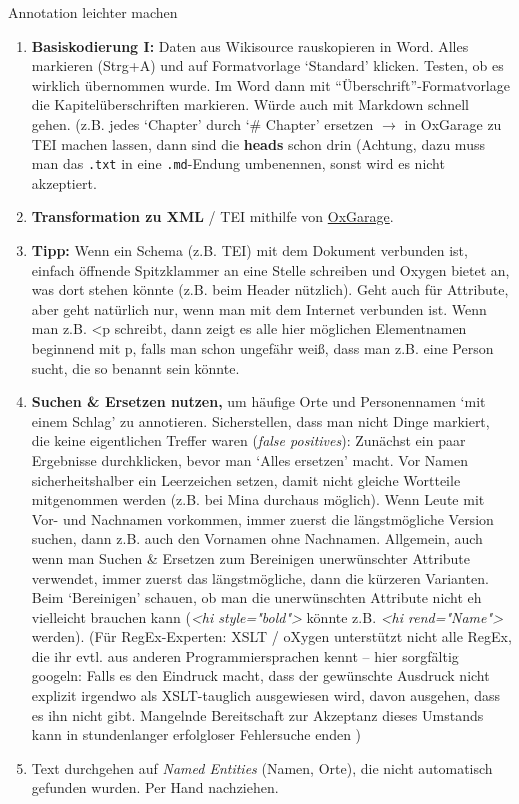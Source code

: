 \begin{frame}[allowframebreaks]{Annotation leichter machen}
\begin{enumerate}
    \item \textbf{Basiskodierung I:} Daten aus Wikisource rauskopieren in Word. Alles markieren (Strg+A) und auf Formatvorlage `Standard' klicken. Testen, ob es wirklich übernommen wurde. Im Word dann mit ``Überschrift''-Formatvorlage die Kapitelüberschriften markieren. Würde auch mit Markdown schnell gehen. 
    (z.B. jedes `Chapter' durch `\# Chapter' ersetzen $\to$ in OxGarage zu TEI machen lassen, dann sind die \textbf{heads} schon drin (Achtung, dazu muss man das \texttt{.txt} in eine \texttt{.md}-Endung umbenennen, sonst wird es nicht akzeptiert.
    \item \textbf{Transformation zu XML} / TEI mithilfe von \href{http://oxgarage.tei-c.org}{OxGarage}.
    \item \textbf{Tipp:} Wenn ein Schema (z.B. TEI) mit dem Dokument verbunden ist, einfach öffnende Spitzklammer an eine Stelle schreiben und Oxygen bietet an, was dort stehen könnte (z.B. beim Header nützlich). Geht auch für Attribute, aber geht natürlich nur, wenn man mit dem Internet verbunden ist. Wenn man z.B. <p schreibt, dann zeigt es alle hier möglichen Elementnamen beginnend mit p, falls man schon ungefähr weiß, dass man z.B. eine Person sucht, die so benannt sein könnte.
    \item \textbf{Suchen \& Ersetzen nutzen,} um häufige Orte und Personennamen `mit einem Schlag' zu annotieren. Sicherstellen, dass man nicht Dinge markiert, die keine eigentlichen Treffer waren (\emph{false positives}): Zunächst ein paar Ergebnisse durchklicken, bevor man `Alles ersetzen' macht. Vor Namen sicherheitshalber ein Leerzeichen setzen, damit nicht gleiche Wortteile mitgenommen werden (z.B. bei Mina durchaus möglich). Wenn Leute mit Vor- und Nachnamen vorkommen, immer zuerst die längstmögliche Version suchen, dann z.B. auch den Vornamen ohne Nachnamen. Allgemein, auch wenn man Suchen \& Ersetzen zum Bereinigen unerwünschter Attribute verwendet, immer zuerst das längstmögliche, dann die kürzeren Varianten. Beim `Bereinigen' schauen, ob man die unerwünschten Attribute nicht eh vielleicht brauchen kann (\emph{<hi style="bold">} könnte z.B. \emph{<hi rend="Name">} werden). (Für RegEx-Experten: XSLT / oXygen unterstützt nicht alle RegEx, die ihr evtl. aus anderen Programmiersprachen kennt -- hier sorgfältig googeln: Falls es den Eindruck macht, dass der gewünschte Ausdruck nicht explizit irgendwo als XSLT-tauglich ausgewiesen wird, davon ausgehen, dass es ihn nicht gibt. Mangelnde Bereitschaft zur Akzeptanz dieses Umstands kann in stundenlanger erfolgloser Fehlersuche enden \faSmileO )
    \item Text durchgehen auf \emph{Named Entities} (Namen, Orte), die nicht automatisch gefunden wurden. Per Hand nachziehen.
\end{enumerate}

\end{frame}


